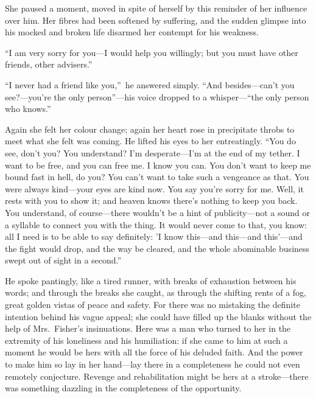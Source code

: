 \documentclass[12pt,a4paper]{book}
\begin{document}
She paused a moment, moved in spite of herself by this reminder
of her influence over him. Her fibres had been softened by
suffering, and the sudden glimpse into his mocked and broken life
disarmed her contempt for his weakness.





``I am very sorry for you---I would help you willingly; but you
must have other friends, other advisers.''





``I never had a friend like you,''\ he answered simply. ``And
besides---can't you see?---you're the only person''---his voice
dropped to a whisper---``the only person who knows.''





Again she felt her colour change; again her heart rose in
precipitate throbs to meet what she felt was coming. He lifted
his eyes to her entreatingly. ``You do see, don't you? You
understand? I'm desperate---I'm at the end of my tether. I
want to be free, and you can free me. I know you can. You don't
want to keep me bound fast in hell, do you? You can't want to
take such a vengeance as that. You were always kind---your eyes
are kind now. You say you're sorry for me. Well, it rests with
you to show it; and heaven knows there's nothing to keep you
back. You understand, of course---there wouldn't be a hint of
publicity---not a sound or a syllable to connect you with the
thing. It would never come to that, you know: all I need is to be
able to say definitely: 'I know this---and this---and this'---and the
fight would drop, and the way be cleared, and the whole
abominable business swept out of sight in a second.''





He spoke pantingly, like a tired runner, with breaks of
exhaustion between his words; and through the breaks she caught,
as through the shifting rents of a fog, great golden vistas of
peace and safety. For there was no mistaking the definite
intention behind his vague appeal; she could have filled up the
blanks without the help of Mrs.\ Fisher's insinuations. Here was a
man who turned to her in the extremity of his loneliness and his
humiliation: if she came to him at such a moment he would be hers
with all the force of his deluded faith. And the power to make
him so lay in her hand---lay there in a completeness he could not
even remotely conjecture. Revenge and rehabilitation might be
hers at a stroke---there was something dazzling in the
completeness of the opportunity.
\end{document}
